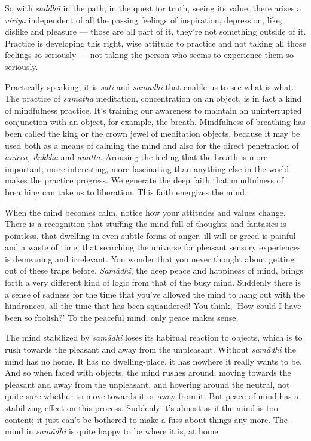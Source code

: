 So with \emph{saddhā} in the path, in the quest for truth, seeing its
value, there arises a \emph{viriya} independent of all the passing
feelings of inspiration, depression, like, dislike and pleasure ---
those are all part of it, they're not something outside of it. Practice
is developing this right, wise attitude to practice and not taking all
those feelings so seriously --- not taking the person who seems to
experience them so seriously.

Practically speaking, it is \emph{sati} and \emph{samādhi} that enable
us to see what is what. The practice of \emph{samatha} meditation,
concentration on an object, is in fact a kind of mindfulness practice.
It's training our awareness to maintain an uninterrupted conjunction
with an object, for example, the breath. Mindfulness of breathing has
been called the king or the crown jewel of meditation objects, because
it may be used both as a means of calming the mind and also for the
direct penetration of \emph{aniccā, dukkha} and \emph{anattā}. Arousing
the feeling that the breath is more important, more interesting, more
fascinating than anything else in the world makes the practice progress.
We generate the deep faith that mindfulness of breathing can take us to
liberation. This faith energizes the mind.

When the mind becomes calm, notice how your attitudes and values change.
There is a recognition that stuffing the mind full of thoughts and
fantasies is pointless, that dwelling in even subtle forms of anger,
ill-will or greed is painful and a waste of time; that searching the
universe for pleasant sensory experiences is demeaning and irrelevant.
You wonder that you never thought about getting out of these traps
before. \emph{Samādhi}, the deep peace and happiness of mind, brings
forth a very different kind of logic from that of the busy mind.
Suddenly there is a sense of sadness for the time that you've allowed
the mind to hang out with the hindrances, all the time that has been
squandered! You think, `How could I have been so foolish?' To the
peaceful mind, only peace makes sense.

The mind stabilized by \emph{samādhi} loses its habitual reaction to
objects, which is to rush towards the pleasant and away from the
unpleasant. Without \emph{samādhi} the mind has no home. It has no
dwelling-place, it has nowhere it really wants to be. And so when faced
with objects, the mind rushes around, moving towards the pleasant and
away from the unpleasant, and hovering around the neutral, not quite
sure whether to move towards it or away from it. But peace of mind has a
stabilizing effect on this process. Suddenly it's almost as if the mind
is too content; it just can't be bothered to make a fuss about things
any more. The mind in \emph{samādhi} is quite happy to be where it is,
at home.


